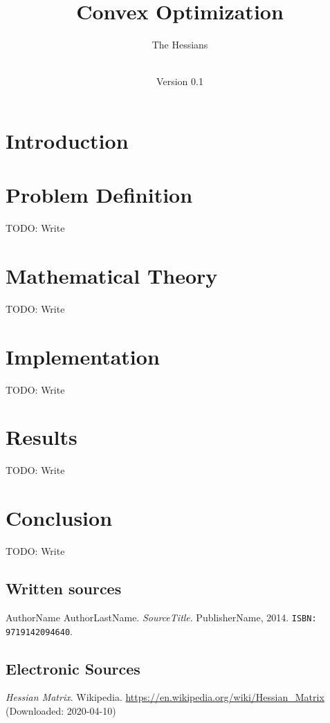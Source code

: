 \documentclass[notitlepage]{article}
\title{Convex Optimization\\}
\author{The Hessians}
\date{\documentdate\\Version 0.1} %
\begin{document}
\maketitle
\projectidentity
\authors

\newpage
\tableofcontents

\newpage
\listoffigures
{} 

\listoftables
{}

\newpage
{}

\section{Introduction}

\newpage

\section{Problem Definition}
TODO: Write
\newpage

\section{Mathematical Theory}
TODO: Write
\newpage

\section{Implementation}
TODO: Write
\newpage

\section{Results}
TODO: Write
\newpage

\section{Conclusion}
TODO: Write
\newpage

\begin{thebibliography}{9}
	\subsection*{Written sources}
	AuthorName AuthorLastName.
	\textit{SourceTitle}.
	PublisherName, 2014.
	\texttt{ISBN: 9719142094640}.
	
	\subsection*{Electronic Sources}
	\textit{Hessian Matrix}.
	Wikipedia.
	\url{https://en.wikipedia.org/wiki/Hessian_Matrix} (Downloaded: 2020-04-10)

\end{thebibliography}
\end{document}
